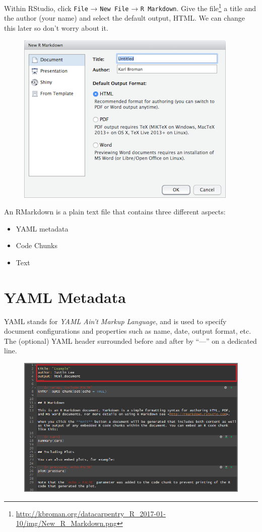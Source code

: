 \documentclass[]{book}
\providecommand{\tightlist}{%
  \setlength{\itemsep}{0pt}\setlength{\parskip}{0pt}}
\let\rmarkdownfootnote\footnote%
\def\footnote{\protect\rmarkdownfootnote}
\theoremstyle{definition}
\theoremstyle{definition}
\theoremstyle{remark}
\begin{document}
Within RStudio, click \texttt{File} → \texttt{New\ File} →
\texttt{R\ Markdown}. Give the file\footnote{\url{http://kbroman.org/datacarpentry_R_2017-01-10/img/New_R_Markdown.png}}
a title and the author (your name) and select the default output, HTML.
We can change this later so don't worry about it.

\begin{figure}[htbp]
\centering
\includegraphics{images/rmd_new.png}
\caption{}
\end{figure}

An RMarkdown is a plain text file that contains three different aspects:

\begin{itemize}
\tightlist
\item
  YAML metadata
\item
  Code Chunks
\item
  Text
\end{itemize}

\section{YAML Metadata}\label{yaml-metadata}

YAML stands for \emph{YAML Ain't Markup Language}, and is used to
specify document configurations and properties such as name, date,
output format, etc. The (optional) YAML header surrounded before and
after by ``---'' on a dedicated line.

\begin{figure}[htbp]
\centering
\includegraphics{images/rmd_yaml.png}
\caption{}
\end{figure}
\end{document}
